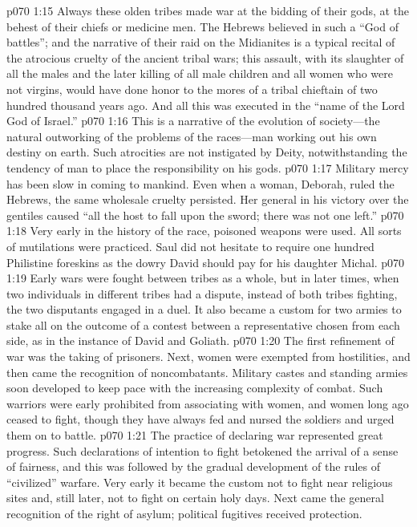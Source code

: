 \pc \vs p070 1:15 Always these olden tribes made war at the bidding of their gods, at the behest of their chiefs or medicine men. The Hebrews believed in such a “God of battles”; and the narrative of their raid on the Midianites is a typical recital of the atrocious cruelty of the ancient tribal wars; this assault, with its slaughter of all the males and the later killing of all male children and all women who were not virgins, would have done honor to the mores of a tribal chieftain of two hundred thousand years ago. And all this was executed in the “name of the Lord God of Israel.”
\vs p070 1:16 This is a narrative of the evolution of society---the natural outworking of the problems of the races---man working out his own destiny on earth. Such atrocities are not instigated by Deity, notwithstanding the tendency of man to place the responsibility on his gods.
\pc \vs p070 1:17 Military mercy has been slow in coming to mankind. Even when a woman, Deborah, ruled the Hebrews, the same wholesale cruelty persisted. Her general in his victory over the gentiles caused “all the host to fall upon the sword; there was not one left.”
\vs p070 1:18 Very early in the history of the race, poisoned weapons were used. All sorts of mutilations were practiced. Saul did not hesitate to require one hundred Philistine foreskins as the dowry David should pay for his daughter Michal.
\vs p070 1:19 Early wars were fought between tribes as a whole, but in later times, when two individuals in different tribes had a dispute, instead of both tribes fighting, the two disputants engaged in a duel. It also became a custom for two armies to stake all on the outcome of a contest between a representative chosen from each side, as in the instance of David and Goliath.
\vs p070 1:20 The first refinement of war was the taking of prisoners. Next, women were exempted from hostilities, and then came the recognition of noncombatants. Military castes and standing armies soon developed to keep pace with the increasing complexity of combat. Such warriors were early prohibited from associating with women, and women long ago ceased to fight, though they have always fed and nursed the soldiers and urged them on to battle.
\vs p070 1:21 The practice of declaring war represented great progress. Such declarations of intention to fight betokened the arrival of a sense of fairness, and this was followed by the gradual development of the rules of “civilized” warfare. Very early it became the custom not to fight near religious sites and, still later, not to fight on certain holy days. Next came the general recognition of the right of asylum; political fugitives received protection.
